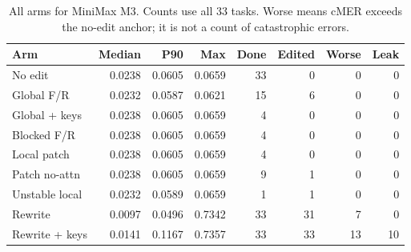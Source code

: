 \begin{table}[htbp]\centering\small
\caption{All arms for MiniMax M3. Counts use all 33 tasks. Worse means cMER exceeds the no-edit anchor; it is not a count of catastrophic errors.}
\begin{tabular}{lrrrrrrr}\toprule
Arm & Median & P90 & Max & Done & Edited & Worse & Leak\\\midrule
No edit & 0.0238 & 0.0605 & 0.0659 & 33 & 0 & 0 & 0\\
Global F/R & 0.0232 & 0.0587 & 0.0621 & 15 & 6 & 0 & 0\\
Global + keys & 0.0238 & 0.0605 & 0.0659 & 4 & 0 & 0 & 0\\
Blocked F/R & 0.0238 & 0.0605 & 0.0659 & 4 & 0 & 0 & 0\\
Local patch & 0.0238 & 0.0605 & 0.0659 & 4 & 0 & 0 & 0\\
Patch no-attn & 0.0238 & 0.0605 & 0.0659 & 9 & 1 & 0 & 0\\
Unstable local & 0.0232 & 0.0589 & 0.0659 & 1 & 1 & 0 & 0\\
Rewrite & 0.0097 & 0.0496 & 0.7342 & 33 & 31 & 7 & 0\\
Rewrite + keys & 0.0141 & 0.1167 & 0.7357 & 33 & 33 & 13 & 10\\
\bottomrule\end{tabular}\end{table}
